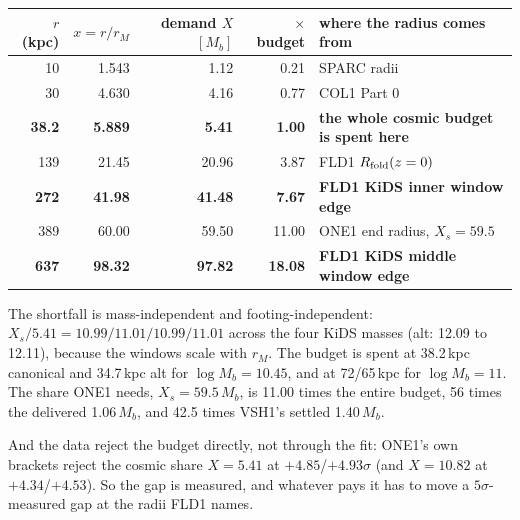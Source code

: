 \documentclass[10pt]{article}
\begin{document}
\begin{center}\small
\begin{tabular}{@{}rrrrl@{}}\toprule
$r$ (kpc) & $x=r/r_M$ & demand $X$ $[M_b]$ & $\times$ budget & where the radius comes from\\\midrule
10   & 1.543  & 1.12  & 0.21  & SPARC radii\\
30   & 4.630  & 4.16  & 0.77  & COL1 Part 0\\
\textbf{38.2} & \textbf{5.889} & \textbf{5.41} & \textbf{1.00} & \textbf{the whole cosmic budget is spent here}\\
139  & 21.45  & 20.96 & 3.87  & FLD1 $R_{\rm fold}(z=0)$\\
\textbf{272} & \textbf{41.98} & \textbf{41.48} & \textbf{7.67} & \textbf{FLD1 KiDS inner window edge}\\
389  & 60.00  & 59.50 & 11.00 & ONE1 end radius, $X_s=59.5$\\
\textbf{637} & \textbf{98.32} & \textbf{97.82} & \textbf{18.08} & \textbf{FLD1 KiDS middle window edge}\\
\bottomrule
\end{tabular}
\end{center}

The shortfall is mass-independent and footing-independent: $X_s/5.41=10.99/11.01/10.99/11.01$ across the four
KiDS masses (alt: 12.09 to 12.11), because the windows scale with $r_M$. The budget is spent at 38.2\,kpc
canonical and 34.7\,kpc alt for $\log M_b=10.45$, and at 72/65\,kpc for $\log M_b=11$. The share ONE1 needs,
$X_s=59.5\,M_b$, is 11.00 times the entire budget, 56 times the delivered 1.06\,$M_b$, and 42.5 times VSH1's
settled 1.40\,$M_b$.

And the data reject the budget directly, not through the fit: ONE1's own brackets reject the cosmic share
$X=5.41$ at $+4.85$/$+4.93\sigma$ (and $X=10.82$ at $+4.34$/$+4.53$). So the gap is measured, and whatever pays
it has to move a $5\sigma$-measured gap at the radii FLD1 names.
\end{document}
